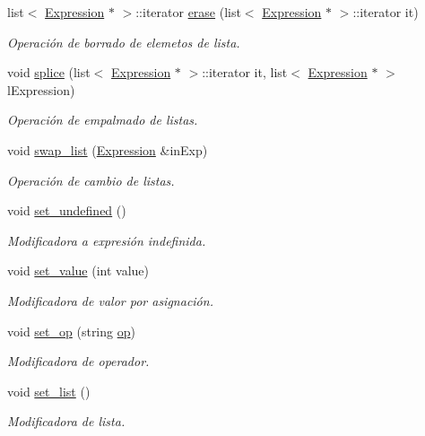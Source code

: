 \begin{DoxyCompactItemize}
list$<$ \hyperlink{class_expression}{Expression} $\ast$ $>$\+::iterator \hyperlink{class_expression_a02af71fa6acf7420bb470e06df846a00}{erase} (list$<$ \hyperlink{class_expression}{Expression} $\ast$ $>$\+::iterator it)
\begin{DoxyCompactList}\small\item\em Operación de borrado de elemetos de lista. \end{DoxyCompactList}\item 
void \hyperlink{class_expression_afcd885fc3562809ede2796b722bb4854}{splice} (list$<$ \hyperlink{class_expression}{Expression} $\ast$ $>$\+::iterator it, list$<$ \hyperlink{class_expression}{Expression} $\ast$ $>$ l\+Expression)
\begin{DoxyCompactList}\small\item\em Operación de empalmado de listas. \end{DoxyCompactList}\item 
void \hyperlink{class_expression_a1668a7770489da5f57801254c35557ee}{swap\+\_\+list} (\hyperlink{class_expression}{Expression} \&in\+Exp)
\begin{DoxyCompactList}\small\item\em Operación de cambio de listas. \end{DoxyCompactList}\item 
void \hyperlink{class_expression_a1d3ddfe83d20f47930792807e8b22248}{set\+\_\+undefined} ()
\begin{DoxyCompactList}\small\item\em Modificadora a expresión indefinida. \end{DoxyCompactList}\item 
void \hyperlink{class_expression_a307683cc3735bf81d823931aab2d64e0}{set\+\_\+value} (int value)
\begin{DoxyCompactList}\small\item\em Modificadora de valor por asignación. \end{DoxyCompactList}\item 
void \hyperlink{class_expression_adffd3a10200510c64055e550e9eebb1f}{set\+\_\+op} (string \hyperlink{class_expression_a30856695b46075ada151f6f6cdfb9fa8}{op})
\begin{DoxyCompactList}\small\item\em Modificadora de operador. \end{DoxyCompactList}\item 
void \hyperlink{class_expression_a66db516be4fa87d58df4806938676508}{set\+\_\+list} ()
\begin{DoxyCompactList}\small\item\em Modificadora de lista. \end{DoxyCompactList}\item 

\end{DoxyCompactItemize}
